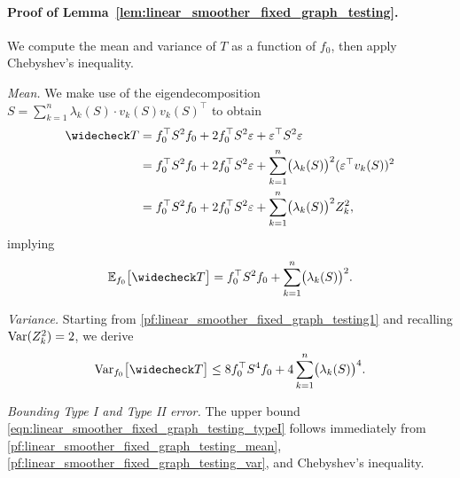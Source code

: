 \paragraph{Proof of Lemma~\ref{lem:linear_smoother_fixed_graph_testing}.}
We compute the mean and variance of $T$ as a function of $f_0$, then apply Chebyshev's inequality.

\textit{Mean.} We make use of the eigendecomposition $S = \sum_{k = 1}^{n} \lambda_k(S) \cdot v_k(S) v_k(S)^{\top}$ to obtain
\begin{equation}
\label{pf:linear_smoother_fixed_graph_testing1}
\begin{aligned}
\wc{T} & = f_0^{\top} S^2 f_0 + 2 f_0^{\top} S^2 \varepsilon + \varepsilon^{\top} S^2 \varepsilon \\
& = f_0^{\top} S^2 f_0 + 2 f_0^{\top} S^2 \varepsilon + \sum_{k = 1}^{n}  \bigl(\lambda_k(S)\bigr)^2 (\varepsilon^{\top} v_k(S))^2 \\
& = f_0^{\top} S^2 f_0 + 2 f_0^{\top} S^2 \varepsilon + \sum_{k = 1}^{n}  \bigl(\lambda_k(S)\bigr)^2 Z_k^2,
\end{aligned}
\end{equation}
implying
\begin{equation}
\label{pf:linear_smoother_fixed_graph_testing_mean}
\Ebb_{f_0}\bigl[\wc{T}\bigr] = f_0^{\top} S^2 f_0 + \sum_{k = 1}^{n} \bigl(\lambda_k(S)\bigr)^2.
\end{equation}

\textit{Variance.} Starting from \eqref{pf:linear_smoother_fixed_graph_testing1} and recalling $\mathrm{Var}(Z_k^2) = 2$, we derive
\begin{equation}
\label{pf:linear_smoother_fixed_graph_testing_var}
\Var_{f_0}\bigl[\wc{T}\bigr] \leq 8 f_0^{\top} S^4 f_0 + 4 \sum_{k = 1}^{n} \bigl(\lambda_k(S)\bigr)^4.
\end{equation}

\textit{Bounding Type I and Type II error.} The upper bound \eqref{eqn:linear_smoother_fixed_graph_testing_typeI} follows immediately from \eqref{pf:linear_smoother_fixed_graph_testing_mean}, \eqref{pf:linear_smoother_fixed_graph_testing_var}, and Chebyshev's inequality.

